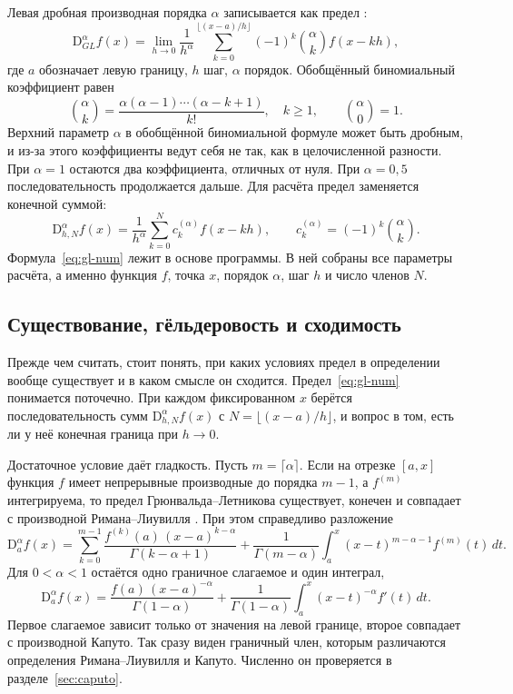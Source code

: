 \documentclass[14pt,a4paper]{extarticle}
\newcommand{\D}{\mathrm{D}}
\begin{document}
Левая дробная производная порядка $\alpha$ записывается как предел \cite{podlubny, samko, oldham}:
\begin{equation}
\D^{\alpha}_{GL}f(x)=\lim_{h\to 0}\frac{1}{h^{\alpha}}\sum_{k=0}^{\lfloor (x-a)/h\rfloor}(-1)^k\binom{\alpha}{k}f(x-kh),
\end{equation}
где $a$ обозначает левую границу, $h$ шаг, $\alpha$ порядок. Обобщённый биномиальный коэффициент равен
\begin{equation}
\binom{\alpha}{k}=\frac{\alpha(\alpha-1)\cdots(\alpha-k+1)}{k!},\quad k\geqslant 1,\qquad \binom{\alpha}{0}=1.
\end{equation}
Верхний параметр $\alpha$ в обобщённой биномиальной формуле может быть дробным, и из-за этого коэффициенты ведут себя не так, как в целочисленной разности. При $\alpha=1$ остаются два коэффициента, отличных от нуля. При $\alpha=0{,}5$ последовательность продолжается дальше. Для расчёта предел заменяется конечной суммой:
\begin{equation}
\D^{\alpha}_{h,N}f(x)=\frac{1}{h^{\alpha}}\sum_{k=0}^{N}c_k^{(\alpha)}f(x-kh),\qquad c_k^{(\alpha)}=(-1)^k\binom{\alpha}{k}.
\label{eq:gl-num}
\end{equation}
Формула~\eqref{eq:gl-num} лежит в основе программы. В ней собраны все параметры расчёта, а именно функция $f$, точка $x$, порядок $\alpha$, шаг $h$ и число членов $N$.

\subsection{Существование, гёльдеровость и сходимость}
\label{sec:existence}

Прежде чем считать, стоит понять, при каких условиях предел в определении вообще существует и в каком смысле он сходится. Предел~\eqref{eq:gl-num} понимается поточечно. При каждом фиксированном $x$ берётся последовательность сумм $\D^{\alpha}_{h,N}f(x)$ с $N=\lfloor(x-a)/h\rfloor$, и вопрос в том, есть ли у неё конечная граница при $h\to0$.

Достаточное условие даёт гладкость. Пусть $m=\lceil\alpha\rceil$. Если на отрезке $[a,x]$ функция $f$ имеет непрерывные производные до порядка $m-1$, а $f^{(m)}$ интегрируема, то предел Грюнвальда--Летникова существует, конечен и совпадает с производной Римана--Лиувилля \cite{podlubny, samko}. При этом справедливо разложение
\begin{equation}
\D^{\alpha}_{a}f(x)=\sum_{k=0}^{m-1}\frac{f^{(k)}(a)\,(x-a)^{k-\alpha}}{\Gamma(k-\alpha+1)}+\frac{1}{\Gamma(m-\alpha)}\int_a^x (x-t)^{m-\alpha-1}f^{(m)}(t)\,dt.
\label{eq:exist}
\end{equation}
Для $0<\alpha<1$ остаётся одно граничное слагаемое и один интеграл,
\begin{equation}
\D^{\alpha}_{a}f(x)=\frac{f(a)\,(x-a)^{-\alpha}}{\Gamma(1-\alpha)}+\frac{1}{\Gamma(1-\alpha)}\int_a^x (x-t)^{-\alpha}f'(t)\,dt.
\label{eq:exist1}
\end{equation}
Первое слагаемое зависит только от значения на левой границе, второе совпадает с производной Капуто. Так сразу виден граничный член, которым различаются определения Римана--Лиувилля и Капуто. Численно он проверяется в разделе~\ref{sec:caputo}.
\end{document}
